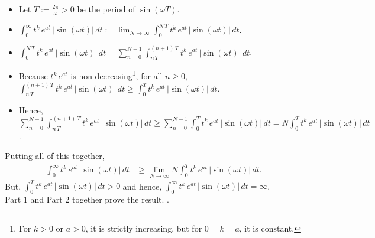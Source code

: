 \begin{itemize}
    \item Let $T:=\frac{2 \pi}{\omega}>0$ be the period of $\sin(\omega T)$. 
    \item  $\displaystyle \int_0^\infty t^k\,e^{at}\, |\sin(\omega t) | \, dt := \lim_{N \to \infty} \int_0^{N\,T} t^k\,e^{at}\, |\sin(\omega t) | \, dt $.
    \item $\displaystyle  \int_0^{N\,T}t^k\,e^{at}\, |\sin(\omega t) | \, dt = \sum_{n=0}^{N-1} \int_{n\, T}^{(n+1)\, T} t^k\,e^{at}\, |\sin(\omega t) | \, dt$.
    \item Because $t^k\,e^{at}$ is non-decreasing\footnote{For $k>0$ or $a >0$, it is strictly increasing, but for $0=k=a$, it is constant.}, for all $n\ge 0$, $\displaystyle  \int_{n\, T}^{(n+1)\, T} t^k\,e^{at}\, |\sin(\omega t) | \, dt \ge \int_{0}^{T} t^k\,e^{at}\, |\sin(\omega t) | \, dt$.
    \item Hence, $\displaystyle  \sum_{n=0}^{N-1} \int_{n\, T}^{(n+1)\, T} t^k\,e^{at}\, |\sin(\omega t) | \, dt\ge \sum_{n=0}^{N-1} \int_{0}^{T} t^k\,e^{at}\, |\sin(\omega t) | \, dt = N \int_{0}^{T} t^k\,e^{at}\, |\sin(\omega t) | \, dt$.
\end{itemize}
Putting all of this together, 
\begin{equation}
    \begin{aligned}
         \int_0^\infty t^k\,e^{at}\, |\sin(\omega t) | \, dt & \ge \lim_{N \to \infty}  N \int_{0}^{T} t^k\,e^{at}\, |\sin(\omega t) | \, dt.
    \end{aligned}
\end{equation}
But, $\int_{0}^{T} t^k\,e^{at}\, |\sin(\omega t) | \, dt>0$ and hence, $\int_0^\infty t^k\,e^{at}\, |\sin(\omega t) | \, dt =\infty$.\\

Part 1 and Part 2 together prove the result.
\Qed.


